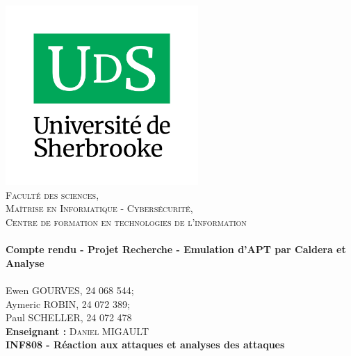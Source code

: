 \begin{titlepage}
\begin{center}
    \includegraphics[width=0.55\textwidth]{images/UdeS_logo_v_rgbHR.png}~\\[0cm]
    \textsc{\large Faculté des sciences, \\Maîtrise en Informatique - Cybersécurité, \\Centre de formation en technologies de l’information
}\\[1.0cm]
    \HRule \\[0.3cm]
    { \LARGE 
      \textbf{Compte rendu - Projet Recherche - Emulation d'APT par Caldera et Analyse}\\[0.3cm]
    }
    \HRule \\[1.0cm]
    { \large
    Ewen GOURVES, 24 068 544;\\[0.2cm]
    Aymeric ROBIN, 24 072 389;\\[0.2cm]
    Paul SCHELLER, 24 072 478\\[0.7cm]
    \textbf{Enseignant :}
    \textsc{Daniel MIGAULT}
    }
    \vfill
    \textbf{\large \\INF808 - Réaction aux attaques et analyses des attaques}
    {\large }

\end{center}
\end{titlepage}